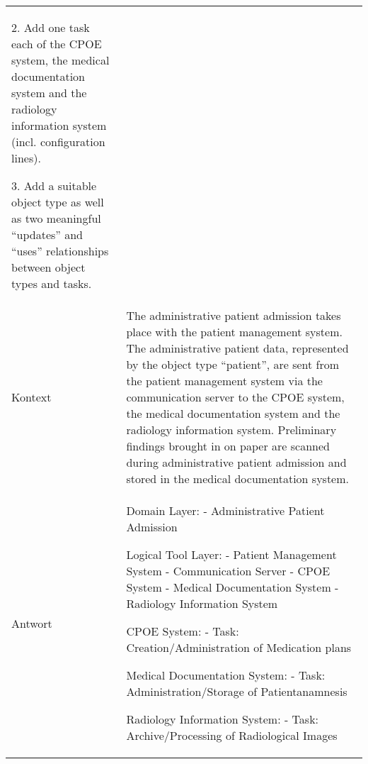 \begin{landscape}
\begin{longtable}{p{3cm}p{}}
    2. Add one task each of the CPOE system, the medical documentation system and the radiology information system (incl.
    configuration lines).

    3. Add a suitable object type as well as two meaningful ``updates'' and ``uses'' relationships between object types and tasks.\\
    Kontext & The administrative patient admission takes place with the patient management system.
    The administrative patient data, represented by the object type ``patient'', are sent from the patient management system via the communication server to the CPOE system, the medical documentation system and the radiology information system.
    Preliminary findings brought in on paper are scanned during administrative patient admission and stored in the medical documentation system.\\
    Antwort & Domain Layer:
    - Administrative Patient Admission

    Logical Tool Layer:
    - Patient Management System
    - Communication Server
    - CPOE System
    - Medical Documentation System
    - Radiology Information System


    CPOE System:
    - Task: Creation/Administration of Medication plans

    Medical Documentation System:
    - Task: Administration/Storage of Patientanamnesis

    Radiology Information System:
    - Task: Archive/Processing of Radiological Images


\end{longtable}
\end{landscape}
